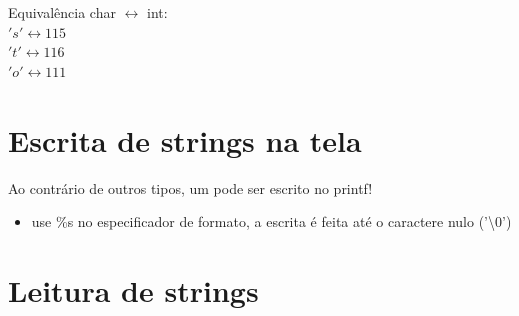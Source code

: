 \documentclass[portuguese,10pt,xcolor=table]{bredelebeamer}
\begin{document}
		\begin{frame} 
			Equivalência char $\leftrightarrow$ int:\\

			$'s' \leftrightarrow 115$\\
			$'t' \leftrightarrow 116$\\
			$'o' \leftrightarrow 111$\\
			
		\end{frame}

	\section{Escrita de strings na tela}

		\begin{frame}[c]
			\begin{center}
				\structure{\large \insertsection}
			\end{center}
		\end{frame} 

		\begin{frame}{\insertsection} 
			Ao contrário de outros tipos, um  pode ser escrito no printf!
			\begin{itemize}
				\item use \%s no especificador de formato, a escrita é feita até o caractere nulo ('\textbackslash0')
					
			\end{itemize}
		\end{frame}


		\def\WN[#1]{\cellcolor{white!40}#1}
		\def\VN[#1]{\cellcolor{blue!40}#1}
		\def\UN[#1]{\cellcolor{green!40}#1}
		\def\RN[#1]{\cellcolor{red!40}#1}

	\section{Leitura de strings}

		\begin{frame}[c]
			\begin{center}
				\structure{\large \insertsection}
			\end{center}
		\end{frame} 
\end{document}

